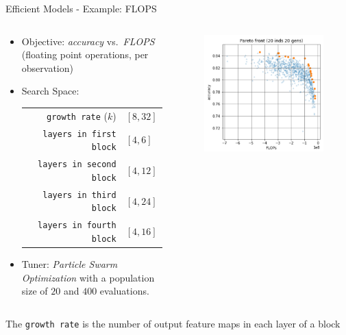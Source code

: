 \begin{frame}{Efficient Models - Example: FLOPS}
\begin{columns}
  \begin{column}{0.65\textwidth}
    \begin{itemize}
      \item Objective: \emph{accuracy} vs.\ \emph{FLOPS} (floating point operations, per observation)
      \item Search Space:\\
        \begin{tabular}{rl}
            \texttt{growth rate} ($k$) & $[8,32]$ \\ %
          \texttt{layers in first block} & $[4, 6]$ \\
          \texttt{layers in second block} & $[4, 12] $ \\
          \texttt{layers in third block} & $[4, 24] $ \\
          \texttt{layers in fourth block} & $[4, 16] $ \\
        \end{tabular}
      \item Tuner: \emph{Particle Swarm Optimization} with a population size of $20$ and $400$ evaluations.
    \end{itemize}
  \end{column}%
  \begin{column}{0.35\textwidth}
    \begin{figure}
    \includegraphics[width=\textwidth]{images/Wang_et_al_2019_Evolving_Deep_Neural_Networks_fig7_1.png}
    \end{figure}
  \end{column}
  \end{columns}

    {\footnotesize The \texttt{growth rate} is the number of output feature maps in each layer of a block}

\end{frame}

